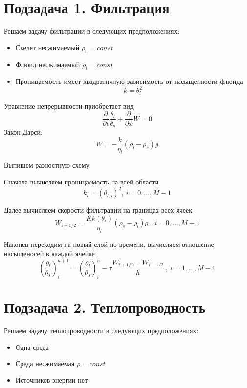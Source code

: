 \documentclass[12pt]{article}
\newcommand{\pd}[2]{\frac{\partial #1}{\partial #2}}
\begin{document}
\section*{Подзадача 1. Фильтрация}

Решаем задачу фильтрации в следующих предположениях:
\begin{itemize}
\item Скелет несжимаемый $\rho_s = const $
\item Флюид несжимаемый $\rho_l = const $
\item Проницаемость имеет квадратичную зависимость от насыщенности флюида
\begin{equation}
k=\theta_l^2
\label{perm}
\end{equation}
\end{itemize}
Уравнение непрерывности приобретает вид
$$
\pd{}{t}\frac{\theta_l}{\theta_s} + \pd{}{x}W = 0
$$
Закон Дарси:
$$
W= -\frac{k}{\eta_l}(\rho_l-\rho_s)g
$$

Выпишем разностную схему

Сначала вычисляем проницаемость на всей области.
\begin{equation}
k_i = (\theta_{l,i})^2 , \ i = 0,  \dots ,M-1
\label{perm_razn}
\end{equation}

Далее вычисляем скорости фильтрации на границах всех ячеек
\begin{equation}
W_{i+1/2} = \frac{K k(\theta_i)}{\eta_l}(\rho_s-\rho_l)g \ , \ i = 0,  \dots ,M-1
\label{Darsi_razn}
\end{equation}

Наконец переходим на новый слой по времени, вычисляем отношение насыщеносей в каждой ячейке
\begin{equation}
\left(\frac{\theta_l}{\theta_s}\right)_i^{n+1} = \left(\frac{\theta_l}{\theta_s}\right)_i^n - \tau\frac{W_{i+1/2} - W_{i-1/2}}{h} \ , \ i = 1,  \dots ,M-1
\label{filtr_razn}
\end{equation}

\newpage
\section*{Подзадача 2. Теплопроводность}
Решаем задачу теплопроводности в следующих предположениях:
\begin{itemize}
\item Одна среда
\item Среда несжимаемая $\rho = const$
\item Источников энергии нет
\end{itemize}
\end{document}

